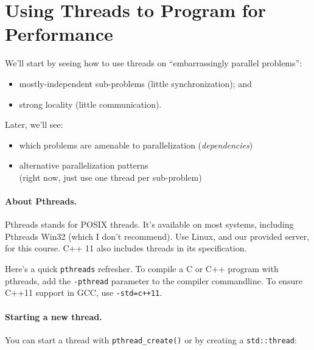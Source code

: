 




\section*{Using Threads to Program for Performance}
We'll start by seeing how to use threads on ``embarrassingly parallel problems'':
  \begin{itemize}
    \item mostly-independent sub-problems (little synchronization); and
    \item strong locality (little communication).
  \end{itemize}

Later, we'll see:
  \begin{itemize}
    \item which problems are amenable to parallelization (\emph{dependencies})
    \item alternative parallelization patterns\\(right now, just use one thread
          per sub-problem)
  \end{itemize}

\paragraph{About Pthreads.} Pthreads stands for POSIX threads. It's available
on most systems, including Pthreads Win32 (which I don't recommend).
Use Linux, and our provided server, for this course. C++ 11 also includes threads
in its specification.

Here's a quick {\tt pthreads} refresher. To compile a C or C++ program
with pthreads, add the {\tt -pthread} parameter to the compiler
commandline. To ensure C++11 support in GCC, use \verb!-std=c++11!.

\paragraph{Starting a new thread.} You can start a thread with
\verb+pthread_create()+ or by creating a \verb+std::thread+:

